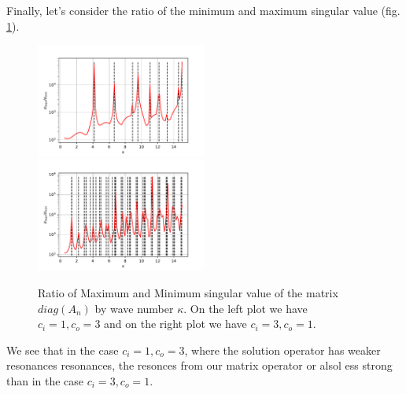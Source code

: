 \documentclass[10pt,journal,compsoc, onecolumn]{IEEEtran}
\begin{document}
Finally, let's consider the ratio of the minimum and maximum singular value (fig. \ref{fig:ratio_sing_val}).
\begin{figure}
    \includegraphics[width=0.5\textwidth]{scenario1Ratio.pdf}
    \includegraphics[width=0.5\textwidth]{scenario2Ratio.pdf}
    \caption{Ratio of Maximum and Minimum singular value of the matrix $diag(A_n)$ by wave number $\kappa$. 
    On the left plot we have $c_i = 1, c_o = 3$ 
    and on the right plot we have $c_i = 3, c_o = 1.$ }
   \label{fig:ratio_sing_val}
\end{figure}
We see that in the case $c_i = 1, c_o =3$, where the solution operator has weaker resonances resonances, the resonces from our matrix operator or alsol ess strong than in the case $c_i = 3, c_o =1$.


%
%
%
\end{document}
